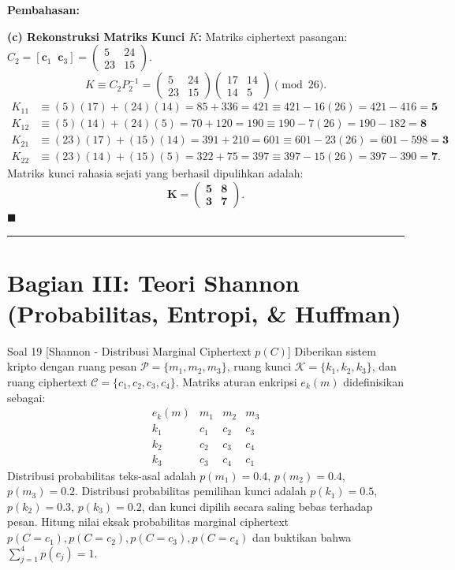 \documentclass[11pt,a4paper]{article}
\newenvironment{solusi}{\noindent\textbf{\textsf{Pembahasan:}}\par\vspace{0.2em}}{\hfill$\blacksquare$\vspace{1em}\par\hrule\vspace{1em}}
\begin{document}
\begin{solusi}
\vspace{0.2cm}
\textbf{(c) Rekonstruksi Matriks Kunci $K$:}
Matriks ciphertext pasangan: $C_2 = [\mathbf{c}_1 \;\; \mathbf{c}_3] = \begin{pmatrix} 5 & 24 \\ 23 & 15 \end{pmatrix}$.
\[
K \equiv C_2 P_2^{-1} = \begin{pmatrix} 5 & 24 \\ 23 & 15 \end{pmatrix} \begin{pmatrix} 17 & 14 \\ 14 & 5 \end{pmatrix} \pmod{26}.
\]
\begin{align*}
K_{11} &\equiv (5)(17) + (24)(14) = 85 + 336 = 421 \equiv 421 - 16(26) = 421 - 416 = \mathbf{5} \\
K_{12} &\equiv (5)(14) + (24)(5) = 70 + 120 = 190 \equiv 190 - 7(26) = 190 - 182 = \mathbf{8} \\
K_{21} &\equiv (23)(17) + (15)(14) = 391 + 210 = 601 \equiv 601 - 23(26) = 601 - 598 = \mathbf{3} \\
K_{22} &\equiv (23)(14) + (15)(5) = 322 + 75 = 397 \equiv 397 - 15(26) = 397 - 390 = \mathbf{7}.
\end{align*}
Matriks kunci rahasia sejati yang berhasil dipulihkan adalah:
\[
\mathbf{K = \begin{pmatrix} 5 & 8 \\ 3 & 7 \end{pmatrix}}.
\]
\end{solusi}

\newpage
\section{Bagian III: Teori Shannon (Probabilitas, Entropi, \& Huffman)}

\begin{soalshannon}{Soal 19 [Shannon - Distribusi Marginal Ciphertext $p(C)$]}
Diberikan sistem kripto dengan ruang pesan $\mathcal{P} = \{m_1, m_2, m_3\}$, ruang kunci $\mathcal{K} = \{k_1, k_2, k_3\}$, dan ruang ciphertext $\mathcal{C} = \{c_1, c_2, c_3, c_4\}$.
Matriks aturan enkripsi $e_k(m)$ didefinisikan sebagai:
\[
\begin{array}{c|ccc}
e_k(m) & m_1 & m_2 & m_3 \\ \hline
k_1 & c_1 & c_2 & c_3 \\
k_2 & c_2 & c_3 & c_4 \\
k_3 & c_3 & c_4 & c_1
\end{array}
\]
Distribusi probabilitas teks-asal adalah $p(m_1) = 0.4$, $p(m_2) = 0.4$, $p(m_3) = 0.2$.
Distribusi probabilitas pemilihan kunci adalah $p(k_1) = 0.5$, $p(k_2) = 0.3$, $p(k_3) = 0.2$, dan kunci dipilih secara saling bebas terhadap pesan.
Hitung nilai eksak probabilitas marginal ciphertext $p(C = c_1), p(C = c_2), p(C = c_3), p(C = c_4)$ dan buktikan bahwa $\sum_{j=1}^4 p(c_j) = 1$.
\end{soalshannon}
\end{document}
